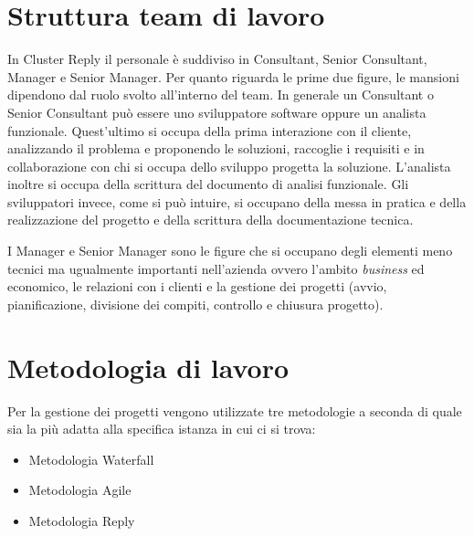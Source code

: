 \section{Struttura team di lavoro}
In Cluster Reply il personale è suddiviso in Consultant, Senior Consultant, Manager e Senior Manager. Per quanto riguarda le prime due figure, le mansioni dipendono dal ruolo svolto all'interno del team. In generale un Consultant o Senior Consultant può essere uno sviluppatore software oppure un analista funzionale. Quest'ultimo si occupa della prima interazione con il cliente, analizzando il problema e proponendo le soluzioni, raccoglie i requisiti e in collaborazione con chi si occupa dello sviluppo progetta la soluzione. L'analista inoltre si occupa della scrittura del documento di analisi funzionale. Gli sviluppatori invece, come si può intuire, si occupano della messa in pratica e della realizzazione del progetto e della scrittura della documentazione tecnica.

I Manager e Senior Manager sono le figure che si occupano degli elementi meno tecnici ma ugualmente importanti nell'azienda ovvero l'ambito \textit{business} ed economico, le relazioni con i clienti e la gestione dei progetti (avvio, pianificazione, divisione dei compiti, controllo e chiusura progetto). 

\section{Metodologia di lavoro}
Per la gestione dei progetti vengono utilizzate tre metodologie a seconda di quale sia la più adatta alla specifica istanza in cui ci si trova:
\begin{itemize}
  \item Metodologia Waterfall
  \item Metodologia Agile
  \item Metodologia Reply
\end{itemize}

